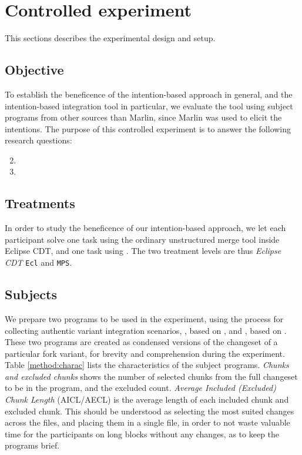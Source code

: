 \section{Controlled experiment}
This sections describes the experimental design and setup.

\subsection{Objective}
To establish the beneficence of the intention-based approach in general, and the intention-based integration tool in particular, we evaluate the tool using subject programs from other sources than Marlin, since Marlin was used to elicit the intentions. The purpose of this controlled experiment is to answer the following research questions:
\begin{enumerate}[label={Q\arabic*}]
    \setcounter{enumi}{1}
    \item \RQB
    \item \RQC
\end{enumerate}

\subsection{Treatments}
In order to study the beneficence of our intention-based approach, we let each participant solve one task using the ordinary unstructured merge tool inside Eclipse CDT, and one task using \tooln. The two treatment levels are thus \textit{Eclipse CDT} \texttt{Ecl} and \textit{\tooln} \texttt{MPS}.

\subsection{Subjects}
We prepare two programs to be used in the experiment, using the process for collecting authentic variant integration scenarios, \po, based on \busybox, and \pt, based on \vim. These two programs are created as condensed versions of the changeset of a particular fork variant, for brevity and comprehension during the experiment. Table \ref{method:charac} lists the characteristics of the subject programs. \textit{Chunks and excluded chunks} shows the number of selected chunks from the full changeset to be in the program, and the excluded count. \textit{Average Included (Excluded) Chunk Length} (AICL/AECL) is the average length of each included chunk and excluded chunk. This should be understood as selecting the most suited changes across the files, and placing them in a single file, in order to not waste valuable time for the participants on long blocks without any changes, as to keep the programs brief.

